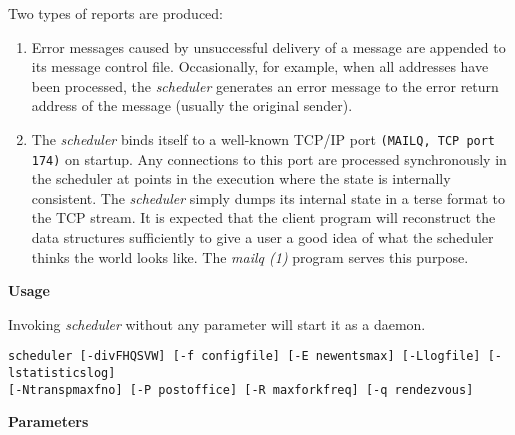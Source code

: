 Two types of reports are produced:
\begin{enumerate}
\item Error messages caused by unsuccessful delivery of a message
are appended to its message control file. Occasionally,
for example, when all addresses have been processed, the {\em scheduler\/}
generates an error message to the error return address of the message
(usually the original sender).  
\item The {\em scheduler\/} binds itself to a well-known TCP/IP port
{\tt (MAILQ, TCP port 174)} on startup.  Any connections to this port
are processed synchronously in the scheduler at points in the execution
where the state is internally consistent. The {\em scheduler\/}
simply dumps its internal state in a terse format to the TCP stream.
It is expected that the client program will reconstruct the data structures
sufficiently to give a user a good idea of what the scheduler thinks the
world looks like. The {\em mailq (1)\/} program serves this purpose.
\end{enumerate}


{\bf Usage}

Invoking {\em scheduler\/} without any parameter will start it as a daemon.

\begin{tscreen}
\begin{verbatim}
scheduler [-divFHQSVW] [-f configfile] [-E newentsmax] [-Llogfile] [-lstatisticslog]
[-Ntranspmaxfno] [-P postoffice] [-R maxforkfreq] [-q rendezvous]
\end{verbatim}
\end{tscreen}


{\bf Parameters}

